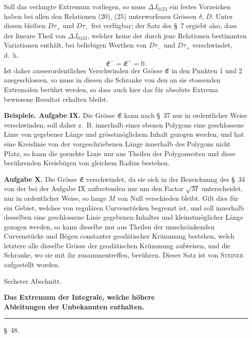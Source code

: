 \documentclass[11pt,a4paper,leqno]{article}
\begin{document}
Soll das verlangte Extremum vorliegen, so muss $\Delta J_{0123}$ ein festes Vorzeichen haben bei allen den Relationen (20), (25) unterworfenen Grössen $\delta$, $D$. Unter diesen bleiben $D\tau_+$ und $D\tau_-$ frei verfügbar; der Satz des \S~7 ergiebt also, dass der lineare Theil
von $\Delta J_{0123}$, welcher keine der durch jene Relationen bestimmten Variationen enthält, bei beliebigen Werthen von $D\tau_-$ und $D\tau_+$ verschwindet, d.~h.
\[
\mathfrak E^- = \mathfrak E^+=0.
\]
Ist daher ausserordentliches Verschwinden der Grösse $\mathfrak E$ in den Punkten 1 und 2 ausgeschlossen, so muss in diesen die Schranke von den an sie stossenden Extremalen berührt werden, so dass auch hier das für absolute Extrema bewiesene Resultat erhalten bleibt.

\textbf{Beispiele. Aufgabe IX.} Die Grösse $\mathfrak E$ kann nach \S~37 nur in ordentlicher Weise verschwinden; soll daher z.~B. innerhalb eines ebenen Polygons eine geschlossene Linie von gegebener Länge und grösstmöglichem Inhalt gezogen werden, und hat eine Kreislinie von der vorgeschriebenen Länge innerhalb des Polygons nicht Platz, so kann die gesuchte Linie nur aus Theilen der Polygonseiten und diese berührenden Kreisbögen von gleichem Radius bestehen.

\textbf{Aufgabe X.} Die Grösse $\mathfrak E$ verschwindet, da sie sich in der Bezeichnung des \S~34 von der bei der Aufgabe IX auftretenden nur um den Factor $\sqrt M$ unterscheidet, nur in ordentlicher Weise, so lange $M$ von Null verschieden bleibt. Gilt dies für ein Gebiet, welches von regulären Curvenstücken begrenzt ist, und soll innerhalb desselben eine geschlossene Linie gegebenen Inhaltes und kleinstmöglicher Länge gezogen werden, so kann dieselbe nur aus Theilen der umschränkenden Curvenstücke und Bögen constanter geodätischer Krümmung bestehen, welch letztere alle dieselbe Grösse der geodätischen Krümmung aufweisen, und die Schranke, wo sie mit ihr zusammentreffen, berühren. Dieser Satz ist von \textsc{Steiner} aufgestellt worden.

\begin{center}
{\large Sechster Abschnitt.}\par
\vspace{2mm}
{\Large\bfseries Das Extremum der Integrale, welche höhere\\ Ableitungen der Unbekannten enthalten.}\par
\vspace{2mm}\rule{32mm}{0.4pt}\par
\vspace{2mm}
{\large \S~48.}
\end{center}
\end{document}
